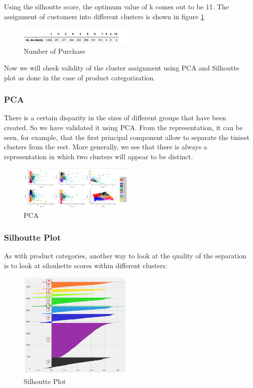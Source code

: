 Using the silhoutte score, the optimum value of k comes out to be 11. The assignment of customers into different clusters is shown in figure \ref{4.3}

\begin{figure}[H]
\caption{Number of Purchase}
\label{4.3}
\centering
\includegraphics[width=0.5\textwidth]{images/4_3.PNG}
\end{figure}

Now we will check validity of the cluster assignment using PCA and Silhoutte plot as done in the case of product categorization.\\

\subsubsection{PCA}

There is a certain disparity in the sizes of different groups that have been created. So we have validated it using PCA. From the representation, it can be seen, for example, that the first principal component allow to separate the tiniest clusters from the rest. More generally, we see that there is always a representation in which two clusters will appear to be distinct.\\


\begin{figure}[H]
\caption{PCA}
\label{4.4}
\centering
\includegraphics[width=0.5\textwidth]{images/4_4.PNG}
\end{figure}

\subsubsection{Silhoutte Plot}

As with product categories, another way to look at the quality of the separation is to look at silouhette scores within different clusters:\\

\begin{figure}[H]
\caption{Silhoutte Plot}
\label{4.5}
\centering
\includegraphics[width=0.5\textwidth]{images/4_5.PNG}
\end{figure}

